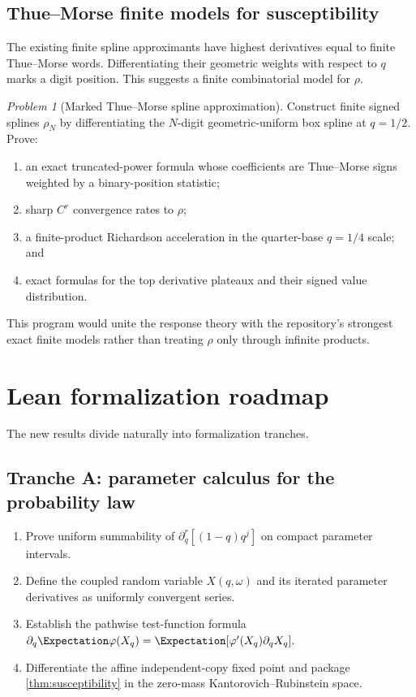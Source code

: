 \documentclass[11pt,oneside]{article}
\theoremstyle{definition}
\theoremstyle{remark}
\newtheorem{problem}[theorem]{Problem}
\begin{document}
\subsection{Thue--Morse finite models for susceptibility}

The existing finite spline approximants have highest derivatives equal to finite Thue--Morse
words.  Differentiating their geometric weights with respect to \(q\) marks a digit position.
This suggests a finite combinatorial model for \(\rho\).

\begin{problem}[Marked Thue--Morse spline approximation]
\label{prob:marked-thue-morse}
Construct finite signed splines \(\rho_N\) by differentiating the \(N\)-digit geometric-uniform
box spline at \(q=1/2\).  Prove:
\begin{enumerate}
\item an exact truncated-power formula whose coefficients are Thue--Morse signs weighted by a
binary-position statistic;
\item sharp \(C^r\) convergence rates to \(\rho\);
\item a finite-product Richardson acceleration in the quarter-base \(q=1/4\) scale; and
\item exact formulas for the top derivative plateaux and their signed value distribution.
\end{enumerate}
\end{problem}

This program would unite the response theory with the repository's strongest exact finite
models rather than treating \(\rho\) only through infinite products.

\section{Lean formalization roadmap}
\label{sec:lean}

The new results divide naturally into formalization tranches.

\subsection{Tranche A: parameter calculus for the probability law}

\begin{enumerate}
\item Prove uniform summability of \(\partial_q^r[(1-q)q^j]\) on compact parameter intervals.
\item Define the coupled random variable \(X(q,\omega)\) and its iterated parameter derivatives
as uniformly convergent series.
\item Establish the pathwise test-function formula
\(
 \partial_q\Expectation\varphi(X_q)=\Expectation[\varphi'(X_q)\partial_qX_q].
\)
\item Differentiate the affine independent-copy fixed point and package
\cref{thm:susceptibility} in the zero-mass Kantorovich--Rubinstein space.
\end{enumerate}
\end{document}
